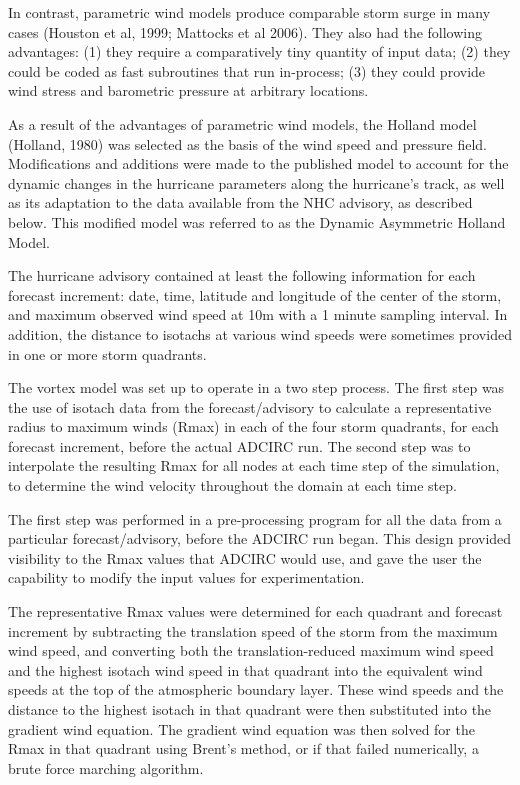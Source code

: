 \documentclass[12pt]{article}
\begin{document}
In contrast, parametric wind models produce comparable storm surge 
in many cases (Houston et al, 1999; Mattocks et al 2006). They also 
had the following advantages: (1) they require a comparatively tiny 
quantity of input data; (2) they could be coded as fast subroutines 
that run in-process; (3) they could provide wind stress and 
barometric pressure at arbitrary locations.

As a result of the advantages of parametric wind models, the Holland 
model (Holland, 1980) was selected as the basis of the wind speed 
and pressure field. Modifications and additions were made to the 
published model to account for the dynamic changes in the hurricane 
parameters along the hurricane's track, as well as its adaptation to 
the data available from the NHC advisory, as described below. This 
modified model was referred to as the Dynamic Asymmetric Holland 
Model.

The hurricane advisory contained at least the following information 
for each forecast increment: date, time, latitude and longitude of 
the center of the storm, and maximum observed wind speed at 10m with 
a 1 minute sampling interval. In addition, the distance to isotachs 
at various wind speeds were sometimes provided in one or more storm 
quadrants.

The vortex model was set up to operate in a two step process. The 
first step was the use of isotach data from the forecast/advisory to 
calculate a representative radius to maximum winds (Rmax) in each of 
the four storm quadrants, for each forecast increment, before the 
actual ADCIRC run. The second step was to interpolate the resulting 
Rmax for all nodes at each time step of the simulation, to determine 
the wind velocity throughout the domain at each time step.

The first step was performed in a pre-processing program for all the 
data from a particular forecast/advisory, before the ADCIRC run 
began. This design provided visibility to the Rmax values that 
ADCIRC would use, and gave the user the capability to modify the 
input values for experimentation.

The representative Rmax values were determined for each quadrant and 
forecast increment by subtracting the translation speed of the storm 
from the maximum wind speed, and converting both the 
translation-reduced maximum wind speed and the highest isotach wind 
speed in that quadrant into the equivalent wind speeds at the top of 
the atmospheric boundary layer. These wind speeds and the distance 
to the highest isotach in that quadrant were then substituted into 
the gradient wind equation. The gradient wind equation was then 
solved for the Rmax in that quadrant using Brent's method, or if 
that failed numerically, a brute force marching algorithm.
\end{document}
